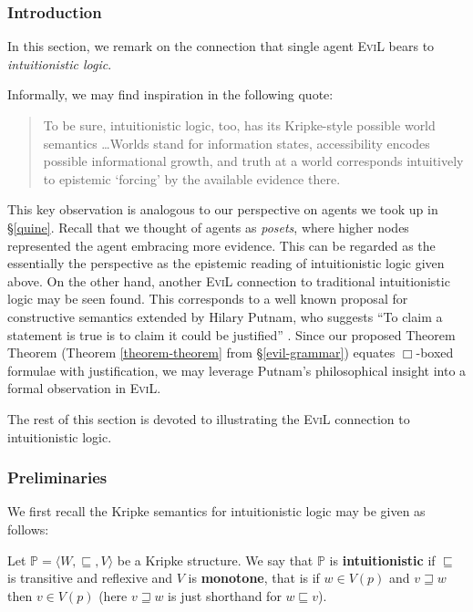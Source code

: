 \subsubsection{Introduction}\label{intro-to-int}
In this section, we remark on the connection that single agent \textsc{EviL} bears
to \emph{intuitionistic logic}.

Informally, we may find inspiration in the following quote:
\begin{quote}
To be sure, intuitionistic logic, too, has its Kripke-style possible
world semantics \ldots Worlds stand for information states,
accessibility encodes possible informational growth, and truth at a
world corresponds intuitively to epistemic `forcing' by the available
evidence there.
\cite{van_benthem_reflectionsepistemic_1991}
\end{quote}

This key observation is analogous to our perspective on agents we took
up in \S\ref{quine}.  Recall that we thought of agents as
\emph{posets}, where higher nodes represented the agent embracing more 
evidence.  This can be regarded as the essentially the perspective as
the epistemic reading of intuitionistic logic given above.  On the
other hand, another \textsc{EviL} connection to traditional
intuitionistic logic may be seen found. This corresponds to a
well known proposal for constructive semantics extended by Hilary
Putnam, who suggests ``To claim a statement is true is to claim it
could be justified'' \cite{putnam_problem_1981}.  
Since our proposed Theorem Theorem (Theorem
\ref{theorem-theorem} from \S\ref{evil-grammar}) equates $\Box$-boxed
formulae with justification, we may leverage Putnam's philosophical insight
into a formal observation in \textsc{EviL}.

The rest of this section is devoted to illustrating the \textsc{EviL}
connection to intuitionistic logic.

\subsubsection{Preliminaries}

We first recall the Kripke semantics for intuitionistic logic may be given
as follows:

\begin{definition}
Let $\mathbb{P} = \langle W, \sqsubseteq, V\rangle$ be a Kripke
structure.  We say that $\mathbb{P}$ is \textbf{intuitionistic} if
$\sqsubseteq$ is transitive and reflexive and $V$ is \textbf{monotone}, that is
if $w \in V(p)$ and $v \sqsupseteq w$ then $v \in V(p)$ (here $v
\sqsupseteq w$ is just shorthand for $w \sqsubseteq v$).
\end{definition}

